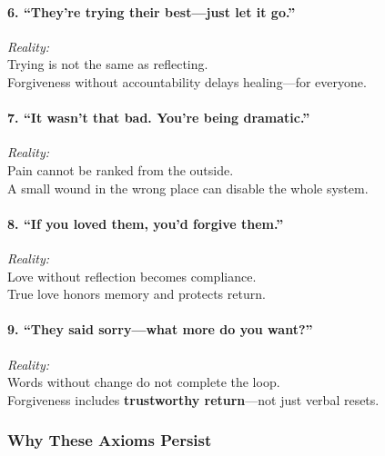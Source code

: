 \paragraph{\texorpdfstring{\textbf{6. ``They're trying their best---just
let it
go.''}}{6. ``They're trying their best---just let it go.''}}\label{theyre-trying-their-bestjust-let-it-go.}

\emph{Reality:\\
} Trying is not the same as reflecting.\\
Forgiveness without accountability delays healing---for everyone.

\paragraph{\texorpdfstring{\textbf{7. ``It wasn't that bad. You're being
dramatic.''}}{7. ``It wasn't that bad. You're being dramatic.''}}\label{it-wasnt-that-bad.-youre-being-dramatic.}

\emph{Reality:\\
} Pain cannot be ranked from the outside.\\
A small wound in the wrong place can disable the whole system.

\paragraph{\texorpdfstring{\textbf{8. ``If you loved them, you'd forgive
them.''}}{8. ``If you loved them, you'd forgive them.''}}\label{if-you-loved-them-youd-forgive-them.}

\emph{Reality:\\
} Love without reflection becomes compliance.\\
True love honors memory and protects return.

\paragraph{\texorpdfstring{\textbf{9. ``They said sorry---what more do
you
want?''}}{9. ``They said sorry---what more do you want?''}}\label{they-said-sorrywhat-more-do-you-want}

\emph{Reality:\\
} Words without change do not complete the loop.\\
Forgiveness includes \textbf{trustworthy return}---not just verbal
resets.

\subsubsection{\texorpdfstring{\textbf{Why These Axioms
Persist}}{Why These Axioms Persist}}\label{why-these-axioms-persist}

